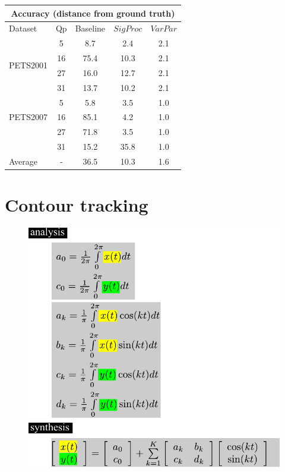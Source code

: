 	\begin{table}
		\centering
		\begin{tabular}{|l|c|c|c|c|}
			\hline
			\multicolumn{5}{|c|}{Accuracy (distance from ground truth)} \\
			\hline
			Dataset & Qp & Baseline & $SigProc$  & $VarPar$\\ 
			\hline
			\multirow{4}{*}{PETS2001} 
				&5  & 8.7 	&   2.4 &   2.1 \\
				&16 & 75.4 &  10.3 &   2.1\\
				&27 &16.0 	&  12.7 &   2.1\\
				&31 &13.7 &  10.2 &   2.1\\
			\hline
			\multirow{3}{*}{PETS2007} 
				&5 &5.8 &   3.5 &   1.0\\
				&16 &85.1 &   4.2 &   1.0\\
				&27 &71.8 &   3.5 &   1.0\\
				&31 &15.2 &  35.8 &   1.0\\
			\hline
			\multirow{1}{*}{Average}
			& - & 36.5 & 10.3 & 1.6 \\  
			\hline
		\end{tabular}
	\end{table}

\section{Contour tracking}
	\begin{figure}
		\includegraphics[height=0.8\textheight]{figs/theory_curves_ellipticalFourier.pdf}
	\end{figure}

